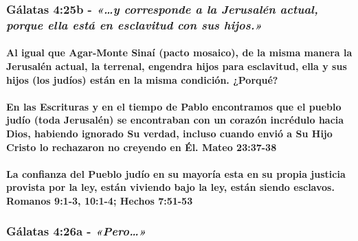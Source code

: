 \documentclass[11a pt,twoside]{article}
\newcommand{\scripture}[1]{%
  {\fontsize{12pt}{16pt}\selectfont\ScriptureFont\itshape #1}%
}
\let\oldsubsubsection\subsubsection
\renewcommand{\subsubsection}{\needspace{4\baselineskip}\oldsubsubsection}
\let\oldparagraph\paragraph
\renewcommand{\paragraph}{\needspace{3\baselineskip}\oldparagraph}
\begin{document}
\subsubsection{\texorpdfstring{Gálatas 4:25b -
\scripture{«…y corresponde a la Jerusalén actual, porque ella está en esclavitud con sus hijos.»}}{Gálatas 4:25b - }}\label{guxe1latas-425b---y-corresponde-a-la-jerusaluxe9n-actual-porque-ella-estuxe1-en-esclavitud-con-sus-hijos.}

\paragraph{Al igual que Agar-Monte Sinaí (pacto mosaico), de la misma
manera la Jerusalén actual, la terrenal, engendra hijos para esclavitud,
ella y sus hijos (los judíos) están en la misma condición.
¿Porqué?}\label{al-igual-que-agar-monte-sinauxed-pacto-mosaico-de-la-misma-manera-la-jerusaluxe9n-actual-la-terrenal-engendra-hijos-para-esclavitud-ella-y-sus-hijos-los-juduxedos-estuxe1n-en-la-misma-condiciuxf3n.-porquuxe9}

\paragraph{En las Escrituras y en el tiempo de Pablo encontramos que el
pueblo judío (toda Jerusalén) se encontraban con un corazón incrédulo
hacia Dios, habiendo ignorado Su verdad, incluso cuando envió a Su Hijo
Cristo lo rechazaron no creyendo en Él. Mateo
23:37-38}\label{en-las-escrituras-y-en-el-tiempo-de-pablo-encontramos-que-el-pueblo-juduxedo-toda-jerusaluxe9n-se-encontraban-con-un-corazuxf3n-incruxe9dulo-hacia-dios-habiendo-ignorado-su-verdad-incluso-cuando-enviuxf3-a-su-hijo-cristo-lo-rechazaron-no-creyendo-en-uxe9l.-mateo-2337-38}

\paragraph{La confianza del Pueblo judío en su mayoría esta en su propia
justicia provista por la ley, están viviendo bajo la ley, están siendo
esclavos. Romanos 9:1-3, 10:1-4; Hechos
7:51-53}\label{la-confianza-del-pueblo-juduxedo-en-su-mayoruxeda-esta-en-su-propia-justicia-provista-por-la-ley-estuxe1n-viviendo-bajo-la-ley-estuxe1n-siendo-esclavos.-romanos-91-3-101-4-hechos-751-53}

\subsubsection{\texorpdfstring{Gálatas 4:26a -
\scripture{«Pero…»}}{Gálatas 4:26a - }}\label{guxe1latas-426a---pero}
\end{document}
